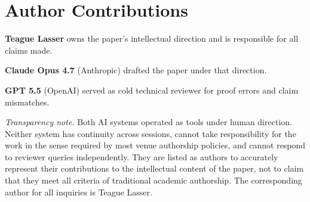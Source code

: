 \section*{Author Contributions}

\textbf{Teague Lasser} owns the paper's intellectual direction
and is responsible for all claims made.

\textbf{Claude Opus 4.7} (Anthropic) drafted the paper under
that direction.

\textbf{GPT 5.5} (OpenAI) served as cold technical reviewer
for proof errors and claim mismatches.

\medskip
\noindent\emph{Transparency note.}
Both AI systems operated as tools under human direction.
Neither system has continuity across sessions, cannot take
responsibility for the work in the sense required by most
venue authorship policies, and cannot respond to reviewer
queries independently.  They are listed as authors to
accurately represent their contributions to the intellectual
content of the paper, not to claim that they meet all criteria
of traditional academic authorship.  The corresponding author
for all inquiries is Teague Lasser.
